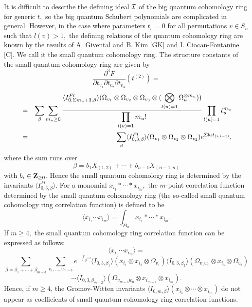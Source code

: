 It is difficult to describe the defining ideal $\cal I$ of the big
quantum cohomology ring for generic $t,$ so the big quantum 
Schubert polynomials are complicated in general. However, 
in the case where parameters $t_v = 0$ for all permutations 
$v\in S_n$ such that 
$l(v) > 1,$ the defining relations of the quantum cohomology 
ring are known by the results of A. Givental and B. Kim [GK] and 
I. Ciocan-Fontanine [C]. We call it the small quantum cohomology 
ring. The structure constants of the small quantum cohomology 
ring are given by 
\[ 
\frac{\partial ^3 F}{\partial t_{v_1} \partial t_{v_2} 
\partial t_{v_3}} (t^{(2)})= \]  
\begin{eqnarray*}
& = &
\sum_{\beta}\sum_{m_u \geq 0}
\frac{\langle I_{0,\Sigma m_u +3,\beta}^{Fl}
\rangle (\Omega _{v_1}
\otimes \Omega _{v_2} \otimes \Omega _{v_3} \otimes \displaystyle(\bigotimes 
_{l(u) =1}\Omega_{u}^{\otimes m_u}))}{\displaystyle\prod_{l(u)=1} m_u !}
\prod_{l(u)=1}t_u^{m_u} \\ 
& = & \sum_{\beta} \langle I_{0,3,\beta}^{Fl} \rangle 
(\Omega_{v_1}\otimes \Omega_{v_2}\otimes \Omega_{v_2}) 
e^{\Sigma b_i t_{(i,i+1)}}, 
\end{eqnarray*} 
where the sum runs over 
\[ \beta = b_1 X_{(1,2)}+\cdots + b_{n-1}X_{(n-1,n)} \] 
with $b_i\in {\bf Z}_{\geq 0}.$ Hence the small quantum cohomology ring is 
determined by the invariants 
$\langle I_{0,3,\beta}^{Fl} \rangle .$ 
For a monomial $x_{i_1}\ast \cdots \ast x_{i_m},$ the 
$m$-point correlation function determined by 
the small quantum cohomology ring (the so-called small quantum cohomology 
ring correlation function) is defined to be
\[ \langle x_{i_1} \cdots x_{i_m} \rangle 
= \int_{Fl_n}x_{i_1}\ast \cdots \ast x_{i_m}. \] 
 If $m\geq 4,$ the small quantum cohomology ring correlation function can
be expressed as follows: 
\[ \langle x_{i_1} \cdots x_{i_m} \rangle = \] 
\[ \sum_{\beta = \beta_1 + \cdots + \beta_{m-3}} 
\sum_{v_1,\ldots ,v_{m-3}} 
e^{ -\int_{\beta}\omega } 
\langle I_{0,3,\beta_1} \rangle (x_{i_1} \otimes x_{i_2} 
\otimes \Omega_{v_1} ) 
\langle I_{0,3,\beta_2} \rangle (\Omega_{v_1 w_0} 
\otimes x_{i_3} \otimes \Omega_{v_2} ) \] 
\[ \cdots 
\langle I_{0,3,\beta_{m-2}} \rangle (\Omega_{v_{m-3} w_0} 
\otimes x_{i_{m-1}} \otimes x_{i_m} ). \] 
Hence, if $m\ge 4$, the Gromov-Witten invariants 
$\langle I_{0,m,\beta} \rangle 
(x_{i_1} \otimes \cdots \otimes x_{i_m})$
do not appear as coefficients of small quantum cohomology ring 
correlation functions. 

